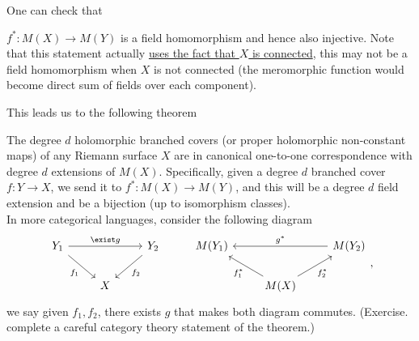 \documentclass{article}
\begin{document}
{One can check that
\begin{proposition}
    $f^*: M(X) \to M(Y)$ is a field homomorphism and hence also injective. Note that this statement actually \underline{uses the fact that $X$ is connected}, this may not be a field homomorphism when $X$ is not connected (the meromorphic function would become direct sum of fields over each component).
\end{proposition}

This leads us to the following theorem
\begin{theorem}
    The degree $d$ holomorphic branched covers (or proper holomorphic non-constant maps) of any Riemann surface $X$ are in canonical one-to-one correspondence with degree $d$ extensions of $M(X)$. Specifically, given a degree $d$ branched cover $f: Y \to X$, we send it to $f^*: M(X) \to M(Y)$, and this will be a degree $d$ field extension and be a bijection (up to isomorphism classes).\\

    In more categorical languages, consider the following diagram
\[\begin{tikzcd}
	{Y_1} && {Y_2} & {M(Y_1)} && {M(Y_2)} \\
	& X &&& {M(X)}
	\arrow["{f_1}"', from=1-1, to=2-2]
	\arrow["{f_2}", from=1-3, to=2-2]
	\arrow["{f_1^*}", from=2-5, to=1-4]
	\arrow["{f_2^*}"', from=2-5, to=1-6]
	\arrow["{\exist g}", from=1-1, to=1-3]
	\arrow["{g^*}"', from=1-6, to=1-4]
\end{tikzcd},\]
we say given $f_1, f_2$, there exists $g$ that makes both diagram commutes. (Exercise. complete a careful category theory statement of the theorem.)
\end{theorem}

}
\end{document}

